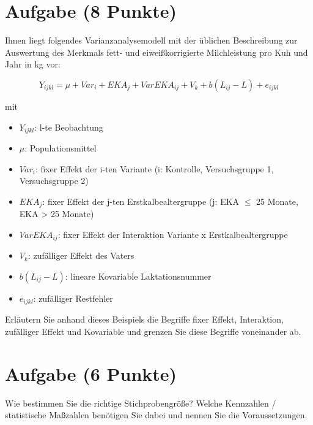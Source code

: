 \documentclass[a4paper, 9pt]{scrartcl}\usepackage[]{graphicx}\usepackage[]{xcolor}
\begin{document}
\section{Aufgabe \hfill (8 Punkte)}
Ihnen liegt folgendes Varianzanalysemodell mit der {\"u}blichen Beschreibung
zur Auswertung des Merkmals fett- und eiwei{\ss}korrigierte Milchleistung pro
Kuh und Jahr in kg vor:

\begin{equation*}
  Y_{ijkl} = \mu + Var_i + EKA_j + VarEKA_{ij} + V_k + b(L_{ij} - L) + e_{ijkl}
\end{equation*}

mit

\begin{itemize}
\item $Y_{ijkl}$: l-te Beobachtung
\item $\mu$: Populationsmittel 
\item $Var_i$: fixer Effekt der i-ten Variante (i: Kontrolle,
  Versuchsgruppe 1, Versuchsgruppe 2)
\item $EKA_j$: fixer Effekt der j-ten Erstkalbealtergruppe (j: EKA $\leq$ 25
  Monate, EKA > 25 Monate)
\item $VarEKA_{ij}$: fixer Effekt der Interaktion Variante x
  Erstkalbealtergruppe 
\item $V_k$: zuf{\"a}lliger Effekt des Vaters 
\item $b(L_{ij} - L)$: lineare Kovariable Laktationsnummer 
\item $e_{ijkl}$: zuf{\"a}lliger
  Restfehler
\end{itemize}
Erl{\"a}utern Sie anhand dieses Beispiels die Begriffe fixer Effekt,
Interaktion, zuf{\"a}lliger Effekt und Kovariable und grenzen Sie diese
Begriffe voneinander ab.



\section{Aufgabe \hfill (6 Punkte)}
Wie bestimmen Sie die richtige Stichprobengr{\"o}{\ss}e? Welche Kennzahlen /
statistische Ma{\ss}zahlen ben{\"o}tigen Sie dabei und nennen Sie die
Voraussetzungen.

 
\end{document}
